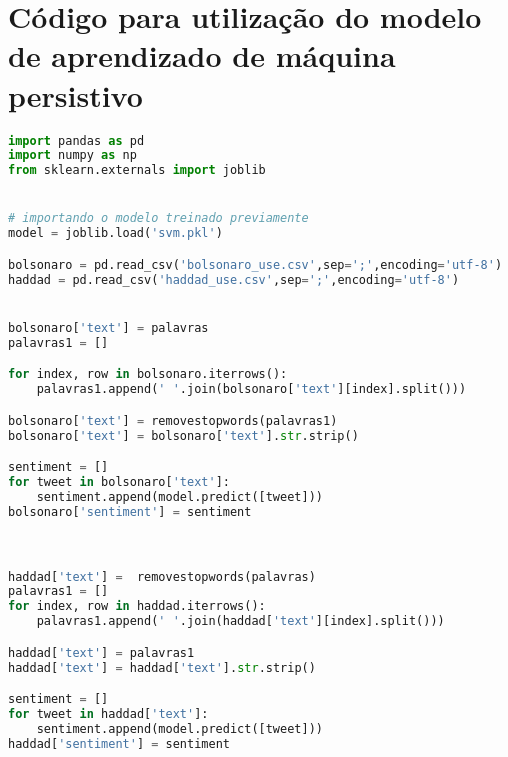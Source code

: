 \section{Código para utilização do modelo de aprendizado de máquina persistivo}
\label{cod:geo}
\begin{lstlisting}[language=Python]
import pandas as pd
import numpy as np
from sklearn.externals import joblib


# importando o modelo treinado previamente
model = joblib.load('svm.pkl')

bolsonaro = pd.read_csv('bolsonaro_use.csv',sep=';',encoding='utf-8')
haddad = pd.read_csv('haddad_use.csv',sep=';',encoding='utf-8')


bolsonaro['text'] = palavras
palavras1 = []

for index, row in bolsonaro.iterrows():
    palavras1.append(' '.join(bolsonaro['text'][index].split()))

bolsonaro['text'] = removestopwords(palavras1)
bolsonaro['text'] = bolsonaro['text'].str.strip()

sentiment = []
for tweet in bolsonaro['text']:
    sentiment.append(model.predict([tweet]))
bolsonaro['sentiment'] = sentiment



haddad['text'] =  removestopwords(palavras)
palavras1 = []
for index, row in haddad.iterrows():
    palavras1.append(' '.join(haddad['text'][index].split()))

haddad['text'] = palavras1
haddad['text'] = haddad['text'].str.strip()

sentiment = []
for tweet in haddad['text']:
    sentiment.append(model.predict([tweet]))
haddad['sentiment'] = sentiment

    
\end{lstlisting}